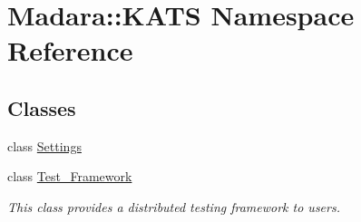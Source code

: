 \hypertarget{namespaceMadara_1_1KATS}{
\section{Madara::KATS Namespace Reference}
\label{dd/daa/namespaceMadara_1_1KATS}
}
\subsection*{Classes}
\begin{DoxyCompactItemize}
\item 
class \hyperlink{classMadara_1_1KATS_1_1Settings}{Settings}
\item 
class \hyperlink{classMadara_1_1KATS_1_1Test__Framework}{Test\_\-Framework}
\begin{DoxyCompactList}\small\item\em This class provides a distributed testing framework to users. \item\end{DoxyCompactList}\end{DoxyCompactItemize}

